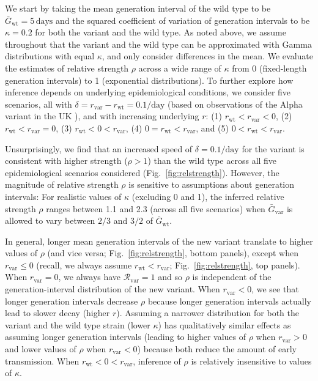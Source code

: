 \documentclass[12pt]{article}
\newcommand{\fref}[1]{Fig.~\ref{fig:#1}}
\newcommand{\vvvar}{\mathrm{var}}
\newcommand{\wwwt}{\mathrm{wt}}
\newcommand{\rx}[1]{\ensuremath{{r}_{#1}}\xspace}
\newcommand{\rw}{\rx{\wwwt}}
\newcommand{\rv}{\rx{\vvvar}}
\newcommand{\Rx}[1]{\ensuremath{{\mathcal R}_{#1}}\xspace}
\newcommand{\Rv}{\Rx{\vvvar}}
\newcommand{\days}{\ensuremath{\, \textrm{days}}}
\newcommand{\pday}{\ensuremath{/\textrm{day}}}
\newcommand{\Gx}[1]{\ensuremath{{\bar G}_{#1}}\xspace}
\newcommand{\Gw}{\Gx{\wwwt}}
\newcommand{\Gv}{\Gx{\vvvar}}
\begin{document}
We start by taking the mean generation interval of the wild type to be $\Gw = 5\days$ \citep{ferretti2020quantifying} and the squared coefficient of variation of generation intervals to be $\kappa=0.2$ \citep{ferretti2020quantifying} for both the variant and the wild type.
As noted above, we assume throughout that the variant and the wild type can be approximated with Gamma distributions with equal $\kappa$, and only consider differences in the mean.
We evaluate the estimates of relative strength $\rho$ across a wide range of $\kappa$ from 0 (fixed-length generation intervals) to 1 (exponential distributions).
To further explore how inference depends on underlying epidemiological conditions, we consider five scenarios, all with $\delta = \rv - \rw = 0.1\pday$ (based on observations of the Alpha variant in the UK \citep{davies2021estimated}), and with increasing underlying $r$: (1) $\rw < \rv < 0$, (2) $\rw < \rv = 0$, (3) $\rw < 0 < \rv$, (4) $0 = \rw < \rv$, and (5) $0 < \rw < \rv$.

Unsurprisingly, we find that an increased speed of $\delta=0.1\pday$ for the variant is consistent with higher strength ($\rho > 1$) than the wild type across all five epidemiological scenarios considered (\fref{relstrength}).
However, the magnitude of relative strength $\rho$ is sensitive to assumptions about generation intervals:
For realistic values of $\kappa$ (excluding 0 and 1), the inferred relative strength $\rho$ ranges between 1.1 and 2.3 (across all five scenarios) when $\Gv$ is allowed to vary between $2/3$ and $3/2$ of \Gw.

In general, longer mean generation intervals of the new variant translate to higher values of $\rho$ (and vice versa;  \fref{relstrength}, bottom panels), except when $\rv \leq 0$ (recall, we always assume $\rw<\rv$; \fref{relstrength}, top panels).
When $\rv = 0$, we always have $\Rv = 1$ and so $\rho$ is independent of the generation-interval distribution of the new variant.
When $\rv < 0$, we see that longer generation intervals decrease $\rho$ because longer generation intervals actually lead to slower decay (higher $r$).
Assuming a narrower distribution for both the variant and the wild type strain (lower $\kappa$) has qualitatively similar effects as assuming longer generation intervals (leading to higher values of $\rho$ when $\rv > 0$ and lower values of $\rho$ when $\rv < 0$) because both reduce the amount of early transmission.
When $\rw < 0 < \rv$, inference of $\rho$ is relatively insensitive to values of $\kappa$.
\end{document}
